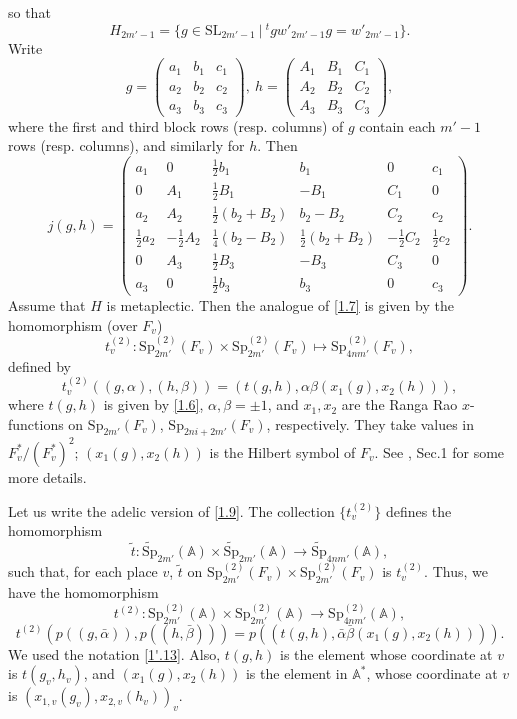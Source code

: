 \documentclass[12pts]{amsart}
\newcommand{\BA}{{\mathbb {A}}}
\newcommand{\SL}{{\mathrm{SL}}}
\newcommand{\Sp}{{\mathrm{Sp}}}
\begin{document}
so that 
$$
H_{2m'-1}=\{g\in \SL_{2m'-1}\ | \
{}^tgw'_{2m'-1}g=w'_{2m'-1}\}.
$$
Write
$$
g=\begin{pmatrix}a_1&b_1&c_1\\a_2&b_2&c_2\\a_3&b_3&c_3\end{pmatrix},\
h=\begin{pmatrix}A_1&B_1&C_1\\A_2&B_2&C_2\\A_3&B_3&C_3\end{pmatrix},
$$
where the first and third block rows (resp. columns) of $g$ contain
each $m'-1$ rows (resp. columns), and similarly for $h$. Then
\begin{equation}\label{1.8}
j(g,h)=\begin{pmatrix}a_1&0&\frac{1}{2}b_1&b_1&0&c_1\\0&A_1&\frac{1}{2}B_1&-B_1&C_1&0\\
a_2&A_2&\frac{1}{2}(b_2+B_2)&b_2-B_2&C_2&c_2\\\frac{1}{2}a_2&-\frac{1}{2}A_2&\frac{1}{4}(b_2-B_2)&\frac{1}{2}(b_2+B_2)&-\frac{1}{2}C_2&\frac{1}{2}c_2\\
0&A_3&\frac{1}{2}B_3&-B_3&C_3&0\\a_3&0&\frac{1}{2}b_3&b_3&0&c_3\end{pmatrix}.
\end{equation}
Assume that $H$ is metaplectic. Then the analogue of \eqref{1.7} is given by the homomorphism (over $F_v$)
$$
t_v^{(2)}:\Sp_{2m'}^{(2)}(F_v)\times \Sp_{2m'}^{(2)}(F_v)\mapsto \Sp_{4nm'}^{(2)}(F_v),
$$
defined by
\begin{equation}\label{1.9}
t_v^{(2)}((g,\alpha),(h,\beta))=(t(g,h),\alpha\beta (x_1(g),x_2(h))),
\end{equation}
where $t(g,h)$ is given by \eqref{1.6}, $\alpha,\beta=\pm 1$, and $x_1,x_2$ are the Ranga Rao $x$-functions on $\Sp_{2m'}(F_v)$, $\Sp_{2ni+2m'}(F_v)$, respectively. They take values in $F_v^*/(F_v^*)^2$; $(x_1(g),x_2(h))$ is the Hilbert symbol of $F_v$. See \cite{GS18}, Sec.1 for some more details. 

Let us write the adelic version of \eqref{1.9}. The collection $\{t_v^{(2)}\}$ defines the homomorphism
$$
\tilde{t}:\widetilde{\Sp}_{2m'}(\BA)\times \widetilde{\Sp}_{2m'}(\BA)\rightarrow \widetilde{\Sp}_{4nm'}(\BA),
$$
such that, for each place $v$, $\tilde{t}$ on $\Sp_{2m'}^{(2)}(F_v)\times \Sp_{2m'}^{(2)}(F_v)$ is $t^{(2)}_v$. Thus, we have the homomorphism
$$
t^{(2)}:\Sp^{(2)}_{2m'}(\BA)\times \Sp^{(2)}_{2m'}(\BA)\rightarrow \Sp^{(2)}_{4nm'}(\BA),
$$
\begin{equation}\label{1.9.1}
t^{(2)}(p((g,\bar{\alpha})),p((h,\bar{\beta})))=p((t(g,h),\bar{\alpha}\bar{\beta} (x_1(g),x_2(h)))).
\end{equation}
We used the notation \eqref{1'.13}. Also, $t(g,h)$ is the element whose coordinate at $v$ is $t(g_v,h_v)$, and $(x_1(g),x_2(h))$ is the element in $\BA^*$, whose coordinate at $v$ is $(x_{1,v}(g_v),x_{2,v}(h_v))_v$.
\end{document}
